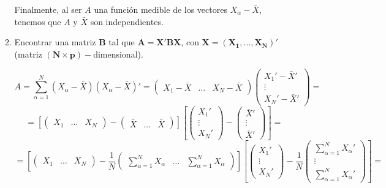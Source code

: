 \documentclass[11pt,a4paper]{article}
\begin{document}
\begin{enumerate}[label=\arabic*.]
\begin{enumerate}[label=(\alph*)]
Finalmente, al ser $A$ una función medible de los vectores $X_{\alpha} - \bar{X}$, tenemos que $A$ y $\bar{X}$ son independientes.

\vspace{1cm}
\bfseries
\item Encontrar una matriz $\mathbf{B}$ tal que $\mathbf{A = X'BX}$, con $\mathbf{X = (X_{1}, \dots, X_{N})'}$ \\ (matriz $\mathbf{(N \times p)-}$dimensional).

\vspace{0.5cm}
\normalfont

$$A = \sum_{\alpha=1}^{N} (X_{\alpha}-\bar{X})(X_{\alpha}-\bar{X})' = \begin{pmatrix}
X_{1} - \bar{X} & \dots & X_{N}-\bar{X}
\end{pmatrix} \begin{pmatrix}
X_{1}'-\bar{X}' \\ \vdots \\ X_{N}'-\bar{X}'
\end{pmatrix} =$$
$$= [\begin{pmatrix}
X_{1} & \dots & X_{N}
\end{pmatrix} - \begin{pmatrix}
\bar{X} & \dots & \bar{X}
\end{pmatrix}] [\begin{pmatrix}
X_{1}' \\ \vdots \\ X_{N}'
\end{pmatrix} - \begin{pmatrix}
\bar{X}' \\ \vdots \\ \bar{X}'
\end{pmatrix}] =$$
$$= [\begin{pmatrix}
X_{1} & \dots & X_{N}
\end{pmatrix} - \frac{1}{N} \begin{pmatrix}
\sum_{\alpha=1}^{N}X_{\alpha} & \dots & \sum_{\alpha=1}^{N}X_{\alpha}
\end{pmatrix}] [\begin{pmatrix}
X_{1}' \\ \vdots \\ X_{N}'
\end{pmatrix} - \frac{1}{N} \begin{pmatrix}
\sum_{\alpha=1}^{N}X_{\alpha}' \\ \vdots \\ \sum_{\alpha=1}^{N}X_{\alpha}'
\end{pmatrix}] =$$

\end{enumerate}
\end{enumerate}
\end{document}

